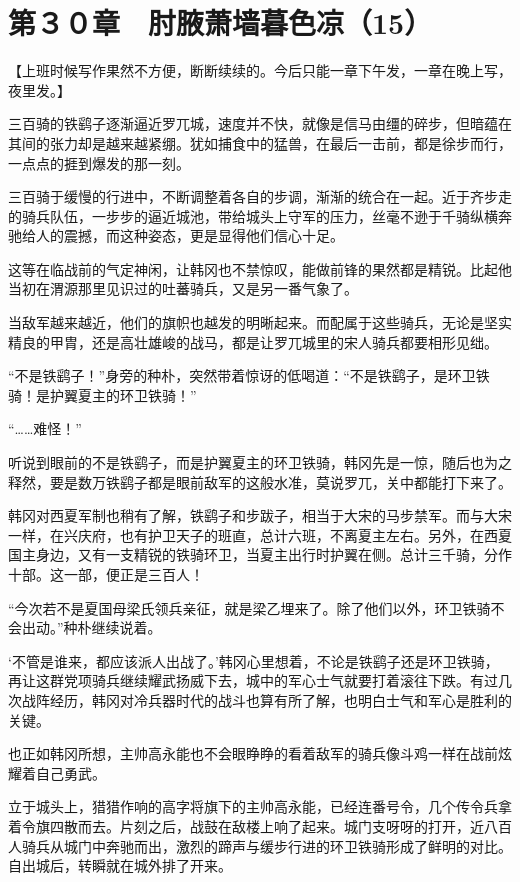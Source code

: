 \section{第３０章　肘腋萧墙暮色凉（15） }

【上班时候写作果然不方便，断断续续的。今后只能一章下午发，一章在晚上写，夜里发。】

三百骑的铁鹞子逐渐逼近罗兀城，速度并不快，就像是信马由缰的碎步，但暗蕴在其间的张力却是越来越紧绷。犹如捕食中的猛兽，在最后一击前，都是徐步而行，一点点的捱到爆发的那一刻。

三百骑于缓慢的行进中，不断调整着各自的步调，渐渐的统合在一起。近于齐步走的骑兵队伍，一步步的逼近城池，带给城头上守军的压力，丝毫不逊于千骑纵横奔驰给人的震撼，而这种姿态，更是显得他们信心十足。

这等在临战前的气定神闲，让韩冈也不禁惊叹，能做前锋的果然都是精锐。比起他当初在渭源那里见识过的吐蕃骑兵，又是另一番气象了。

当敌军越来越近，他们的旗帜也越发的明晰起来。而配属于这些骑兵，无论是坚实精良的甲胄，还是高壮雄峻的战马，都是让罗兀城里的宋人骑兵都要相形见绌。

“不是铁鹞子！”身旁的种朴，突然带着惊讶的低喝道：“不是铁鹞子，是环卫铁骑！是护翼夏主的环卫铁骑！”

“……难怪！”

听说到眼前的不是铁鹞子，而是护翼夏主的环卫铁骑，韩冈先是一惊，随后也为之释然，要是数万铁鹞子都是眼前敌军的这般水准，莫说罗兀，关中都能打下来了。

韩冈对西夏军制也稍有了解，铁鹞子和步跋子，相当于大宋的马步禁军。而与大宋一样，在兴庆府，也有护卫天子的班直，总计六班，不离夏主左右。另外，在西夏国主身边，又有一支精锐的铁骑环卫，当夏主出行时护翼在侧。总计三千骑，分作十部。这一部，便正是三百人！

“今次若不是夏国母梁氏领兵亲征，就是梁乙埋来了。除了他们以外，环卫铁骑不会出动。”种朴继续说着。

‘不管是谁来，都应该派人出战了。’韩冈心里想着，不论是铁鹞子还是环卫铁骑，再让这群党项骑兵继续耀武扬威下去，城中的军心士气就要打着滚往下跌。有过几次战阵经历，韩冈对冷兵器时代的战斗也算有所了解，也明白士气和军心是胜利的关键。

也正如韩冈所想，主帅高永能也不会眼睁睁的看着敌军的骑兵像斗鸡一样在战前炫耀着自己勇武。

立于城头上，猎猎作响的高字将旗下的主帅高永能，已经连番号令，几个传令兵拿着令旗四散而去。片刻之后，战鼓在敌楼上响了起来。城门支呀呀的打开，近八百人骑兵从城门中奔驰而出，激烈的蹄声与缓步行进的环卫铁骑形成了鲜明的对比。自出城后，转瞬就在城外排了开来。

